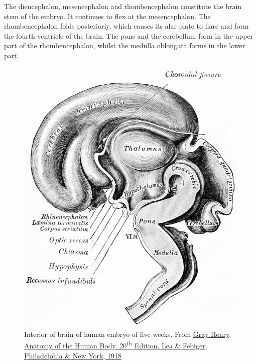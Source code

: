 The diencephalon, mesencephalon and rhombencephalon constitute the brain stem of the embryo. It continues to flex at the mesencephalon. The rhombencephalon folds posteriorly, which causes its alar plate to flare and form the fourth ventricle of the brain. The pons and the cerebellum form in the upper part of the rhombencephalon, whilst the medulla oblongata forms in the lower part.



\begin{figure}

{\centering \includegraphics[width=0.7\linewidth]{./figures/development/GrayAnat1918p743} 

}

\caption{Interior of brain of human embryo of five weeks. From \href{https://archive.org/details/anatomyofhumanbo1918gray/page/n6/mode/2up}{Gray Henry, Anatomy of the Human Body. 20\textsuperscript{th} Edition, Lea \& Febiger, Philadelphia \& New York, 1918}}\label{fig:threemonths}
\end{figure}



